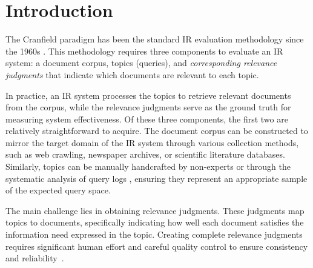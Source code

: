 \section{Introduction}
\label{sec:introduction}
The Cranfield paradigm has been the standard \ac{IR} evaluation methodology since the 1960s \cite{Cleverdon1960TheAC,10.5555/275537.275544}. This methodology requires three components to evaluate an \ac{IR} system: a document corpus, topics (queries), and \textit{corresponding relevance judgments} that indicate which documents are relevant to each topic.

In practice, an \ac{IR} system processes the topics to retrieve relevant documents from the corpus, while the relevance judgments serve as the ground truth for measuring system effectiveness. Of these three components, the first two are relatively straightforward to acquire. The document corpus can be constructed to mirror the target domain of the \ac{IR} system through various collection methods, such as web crawling, newspaper archives, or scientific literature databases. Similarly, topics can be manually handcrafted by non-experts or through the systematic analysis of query logs \cite{DBLP:conf/nips/NguyenRSGTMD16}, ensuring they represent an appropriate sample of the expected query space.


The main challenge lies in obtaining relevance judgments. These judgments map topics to documents, specifically indicating how well each document satisfies the information need expressed in the topic. Creating complete relevance judgments requires significant human effort and careful quality control to ensure consistency and reliability~\citep{DBLP:journals/ftir/Sanderson10}.

